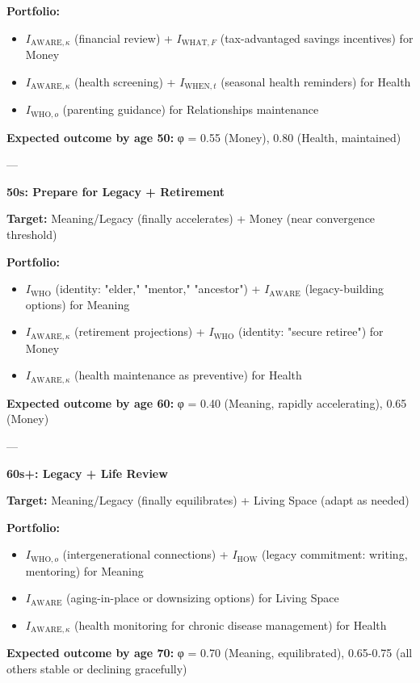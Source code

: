 {{{\textbf{Portfolio:}
\begin{itemize}[nosep]
\item $I_{\text{AWARE},\kappa}$ (financial review) + $I_{\text{WHAT},F}$ (tax-advantaged savings incentives) for Money
\item $I_{\text{AWARE},\kappa}$ (health screening) + $I_{\text{WHEN},t}$ (seasonal health reminders) for Health
\item $I_{\text{WHO},o}$ (parenting guidance) for Relationships maintenance
\end{itemize}

\textbf{Expected outcome by age 50:} φ = 0.55 (Money), 0.80 (Health, maintained)

---

\textbf{50s: Prepare for Legacy + Retirement}

\textbf{Target:} Meaning/Legacy (finally accelerates) + Money (near convergence threshold)

\textbf{Portfolio:}
\begin{itemize}[nosep]
\item $I_{\text{WHO}}$ (identity: "elder," "mentor," "ancestor") + $I_{\text{AWARE}}$ (legacy-building options) for Meaning
\item $I_{\text{AWARE},\kappa}$ (retirement projections) + $I_{\text{WHO}}$ (identity: "secure retiree") for Money
\item $I_{\text{AWARE},\kappa}$ (health maintenance as preventive) for Health
\end{itemize}

\textbf{Expected outcome by age 60:} φ = 0.40 (Meaning, rapidly accelerating), 0.65 (Money)

---

\textbf{60s+: Legacy + Life Review}

\textbf{Target:} Meaning/Legacy (finally equilibrates) + Living Space (adapt as needed)

\textbf{Portfolio:}
\begin{itemize}[nosep]
\item $I_{\text{WHO},o}$ (intergenerational connections) + $I_{\text{HOW}}$ (legacy commitment: writing, mentoring) for Meaning
\item $I_{\text{AWARE}}$ (aging-in-place or downsizing options) for Living Space
\item $I_{\text{AWARE},\kappa}$ (health monitoring for chronic disease management) for Health
\end{itemize}

\textbf{Expected outcome by age 70:} φ = 0.70 (Meaning, equilibrated), 0.65-0.75 (all others stable or declining gracefully)

}}}
